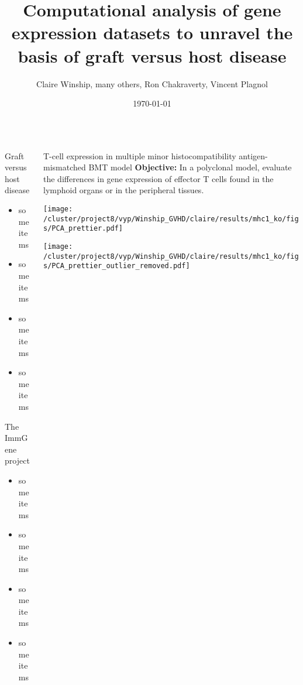 \documentclass[final,hyperref={pdfpagelabels=false}]{beamer}
\title[GVHD]{Computational analysis of gene expression datasets to unravel the basis of graft versus host disease}
\author[Winship \& Plagnol]{Claire Winship, many others, Ron Chakraverty, Vincent Plagnol}
\institute[UGI]{UCL Genetics Institute}
\date{\today}
\begin{document}
  \begin{frame}{} 

  \begin{beamercolorbox}{}
    \maketitle
  \end{beamercolorbox}


    \vfill
    \begin{columns}[t]

      \begin{column}{.25\linewidth}
        \begin{block}{Graft versus host disease}
          \begin{itemize}
          \item some items
          \item some items
          \item some items
          \item some items
          \end{itemize}
        \end{block}


        \begin{block}{The ImmGene project}
          \begin{itemize}
          \item some items
          \item some items
          \item some items
          \item some items
          \end{itemize}
        \end{block}

      \end{column}


      \begin{column}{.24\linewidth}
        \begin{block}{T-cell expression in multiple minor histocompatibility antigen-mismatched BMT model}
	  {\bf Objective:} In a polyclonal model, evaluate the differences in gene expression of effector T cells found in the lymphoid organs or in the peripheral tissues.

	  \begin{minipage}{0.45\textwidth}
	    \texttt{[image: /cluster/project8/vyp/Winship\_GVHD/claire/results/mhc1\_ko/figs/PCA\_prettier.pdf]}
	  \end{minipage}	  
	  \begin{minipage}{0.45\textwidth}
	    \texttt{[image: /cluster/project8/vyp/Winship\_GVHD/claire/results/mhc1\_ko/figs/PCA\_prettier\_outlier\_removed.pdf]}
	  \end{minipage}	  
	  

\end{block}
\end{column}
\end{columns}
\end{frame}
\end{document}

